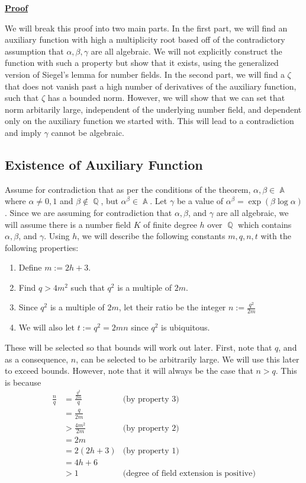 \documentclass[a4paper, 11pt]{book}
\newcommand{\proof}{\underline{\textbf{Proof}} }
\DeclareMathOperator{\A}{\mathbb{A}}
\DeclareMathOperator{\Q}{\mathbb{Q}}
\begin{document}
\proof{We will break this proof into two main parts. In the first part, we will find an auxiliary function with high a multiplicity root based off of the contradictory assumption that $\alpha, \beta, \gamma$ are all algebraic. We will not explicitly construct the function with such a property but show that it exists, using the generalized version of Siegel's lemma for number fields. In the second part, we will find a $\zeta$ that does not vanish past a high number of derivatives of the auxiliary function, such that $\zeta$ has a bounded norm. However, we will show that we can set that norm arbitarily large, independent of the underlying number field, and dependent only on the auxiliary function we started with. This will lead to a contradiction and imply $\gamma$ cannot be algebraic.

    \subsection{Existence of Auxiliary Function} Assume for contradiction that as per the conditions of the theorem, $\alpha, \beta \in \A$ where $\alpha \neq 0, 1$ and $\beta \notin \Q$, but $\alpha^{\beta} \in \A$. Let $\gamma$ be a value of ${\alpha}^{\beta} = \exp(\beta \log \alpha)$. Since we are assuming for contradiction that $\alpha, \beta$, and $\gamma$ are all algebraic, we will assume there is a number field $K$ of finite degree $h$ over $\Q$ which contains $\alpha, \beta$, and $\gamma$. Using $h$, we will describe the following constants $m,q,n,t$ with the following properties:

    \begin{enumerate}
        \item{Define $m := 2h+3$.}
        \item{Find $q > 4m^2$ such that $q^2$ is a multiple of $2m$.}
        \item{Since $q^2$ is a multiple of $2m$, let their ratio be the integer $n := \frac{q^2}{2m}$}
        \item{We will also let $t := q^2 = 2mn$ since $q^2$ is ubiquitous.}
    \end{enumerate}

    These will be selected so that bounds will work out later. First, note that $q$, and as a consequence, $n$, can be selected to be arbitrarily large. We will use this later to exceed bounds. However, note that it will always be the case that $n > q$. This is because 
    \begin{align*}
        \frac{n}{q} &= \frac{\frac{q^2}{2m}}{q} & \text{(by property 3)}\\
                    &= \frac{q}{2m} \\
                    &> \frac{4m^2}{2m} &\text{(by property 2)}\\
                    &= 2m \\
                    &= 2(2h+3) &\text{(by property 1)}\\
                    &= 4h+6 \\
                    &> 1 &\text{(degree of field extension is positive)} 
    \end{align*}

}
\end{document}
